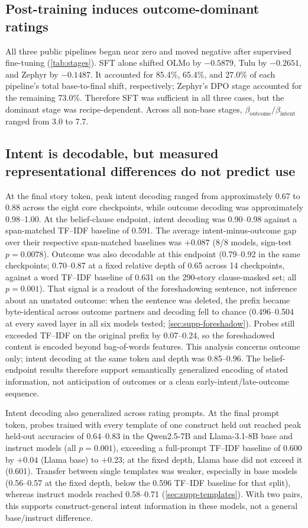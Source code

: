 \documentclass[11pt]{article}
\newcommand{\intentbeta}{\beta_{\mathrm{intent}}}
\newcommand{\outcomebeta}{\beta_{\mathrm{outcome}}}
\begin{document}
\subsection{Post-training induces outcome-dominant ratings}

All three public pipelines began near zero and moved negative after supervised fine-tuning (\cref{tab:stages}).
SFT alone shifted OLMo by $-0.5879$, Tulu by $-0.2651$, and Zephyr by $-0.1487$.
It accounted for 85.4\%, 65.4\%, and 27.0\% of each pipeline's total base-to-final shift, respectively; Zephyr's DPO stage accounted for the remaining 73.0\%.
Therefore SFT was sufficient in all three cases, but the dominant stage was recipe-dependent.
Across all non-base stages, $\outcomebeta/\intentbeta$ ranged from 3.0 to 7.7.


\subsection{Intent is decodable, but measured representational differences do not predict use}

At the final story token, peak intent decoding ranged from approximately 0.67 to 0.88 across the eight core checkpoints, while outcome decoding was approximately 0.98--1.00.
At the belief-clause endpoint, intent decoding was 0.90--0.98 against a span-matched TF--IDF baseline of 0.591.
The average intent-minus-outcome gap over their respective span-matched baselines was $+0.087$ (8/8 models, sign-test $p=0.0078$).
Outcome was also decodable at this endpoint (0.79--0.92 in the same checkpoints; 0.70--0.87 at a fixed relative depth of 0.65 across 14 checkpoints, against a word TF--IDF baseline of 0.631 on the 290-story clause-masked set; all $p=0.001$).
That signal is a readout of the foreshadowing sentence, not inference about an unstated outcome: when the sentence was deleted, the prefix became byte-identical across outcome partners and decoding fell to chance (0.496--0.504 at every saved layer in all six models tested; \cref{sec:supp-foreshadow}).
Probes still exceeded TF--IDF on the original prefix by 0.07--0.24, so the foreshadowed content is encoded beyond bag-of-words features.
This analysis concerns outcome only; intent decoding at the same token and depth was 0.85--0.96.
The belief-endpoint results therefore support semantically generalized encoding of stated information, not anticipation of outcomes or a clean early-intent/late-outcome sequence.

Intent decoding also generalized across rating prompts.
At the final prompt token, probes trained with every template of one construct held out reached peak held-out accuracies of 0.64--0.83 in the Qwen2.5-7B and Llama-3.1-8B base and instruct models (all $p=0.001$), exceeding a full-prompt TF--IDF baseline of 0.600 by $+0.04$ (Llama base) to $+0.23$; at the fixed depth, Llama base did not exceed it (0.601).
Transfer between single templates was weaker, especially in base models (0.56--0.57 at the fixed depth, below the 0.596 TF--IDF baseline for that split), whereas instruct models reached 0.58--0.71 (\cref{sec:supp-templates}).
With two pairs, this supports construct-general intent information in these models, not a general base/instruct difference.
\end{document}
